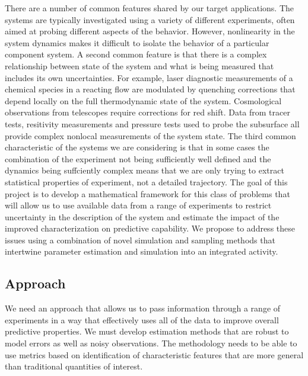 \documentclass[11pt]{article}
\begin{document}
There are a number of common features shared by our target applications.
The systems are typically investigated using a variety of different experiments, often
aimed at probing different aspects of the behavior.
However, nonlinearity in the system dynamics makes it difficult to isolate the behavior of
a particular component system.
A second common feature is that there is a complex relationship between state of the system and
what is being measured that includes its own uncertainties.  For example, laser diagnostic measurements
of a chemical species in a reacting flow are modulated by quenching corrections that depend locally on the full
thermodynamic state of the system.  Cosmological observations from telescopes require corrections for
red shift. Data from tracer tests, resitivity measurements and pressure tests used to probe the subsurface
all provide complex nonlocal measurements of the system state. 
The third common characteristic of the systems we are considering is that in some cases
the combination of the experiment not being sufficiently well defined 
and the dynamics being suffciently complex means that we are only trying to extract
statistical properties of experiment, not a detailed trajectory.
The goal of this project is to develop a
mathematical framework for this class of problems that will allow us to use available data from a range
of experiments to restrict
uncertainty in the description of the system and estimate the impact of the improved characterization
on predictive capability.
We propose to address these issues using a combination of novel simulation and sampling methods that
intertwine parameter estimation and simulation into an integrated activity.

\subsection*{Approach}
We need an approach that allows us to pass
information through a range of experiments in a way that effectively uses all of the data
to improve overall predictive properties.
We must develop estimation methods that are robust to model errors as well as noisy observations.
The methodology needs to be able to use metrics based on identification of
characteristic features that are more general than
traditional quantities of interest.
\end{document}
